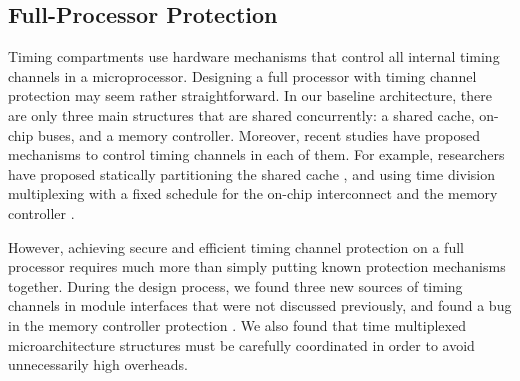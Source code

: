 \subsection{Full-Processor Protection}

Timing compartments use hardware mechanisms that control all internal timing 
channels in a microprocessor. Designing a full processor with timing channel
protection may seem rather straightforward. In our baseline architecture, there are
only three main structures that are shared concurrently: a shared cache, on-chip
buses, and a memory controller. Moreover, recent studies have proposed mechanisms
to control timing channels in each of them. For example, researchers have proposed
statically partitioning the shared cache \cite{percival}, and using time division 
multiplexing with a fixed schedule for the on-chip interconnect 
\cite{yaonocs, surfnoc} and the memory controller \cite{ushpca14}.


However, achieving secure and efficient timing channel protection on a full processor
requires much more than simply putting known protection mechanisms
together. During the design process, we found three new sources of timing channels
in module interfaces that were not discussed previously, and found a bug in the
memory controller protection \cite{ushpca14}.
We also found that time multiplexed
microarchitecture structures must be carefully coordinated in order to avoid 
unnecessarily high overheads. 

